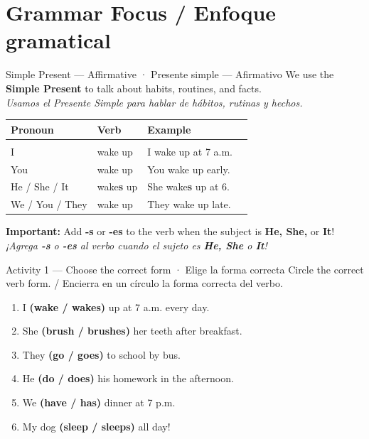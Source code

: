 
\section{Grammar Focus / Enfoque gramatical}

\begin{grammartip}{Simple Present — Affirmative · Presente simple — Afirmativo}
We use the \textbf{Simple Present} to talk about habits, routines, and facts. \\
\textit{Usamos el Presente Simple para hablar de hábitos, rutinas y hechos.}

\bigskip
\begin{center}
\begin{tabular}{llll}
\bfseries\color{kidsOrange}Pronoun & \bfseries\color{kidsOrange}Verb & \bfseries Example \\[4pt]
\hline\\[-6pt]
I              & wake up  & I wake up at 7 a.m.         \\
You            & wake up  & You wake up early.          \\
He / She / It  & wake\textbf{s} up & She wake\textbf{s} up at 6. \\
We / You / They & wake up & They wake up late.          \\
\end{tabular}
\end{center}

\bigskip
{\color{kidsRed}} \textbf{Important:} Add \textbf{-s} or \textbf{-es} to the verb when the subject is \textbf{He, She,} or \textbf{It}! \\
\textit{¡Agrega \textbf{-s} o \textbf{-es} al verbo cuando el sujeto es \textbf{He, She} o \textbf{It}!}
\end{grammartip}

\vspace{14pt}

\begin{activity}{Activity 1 — Choose the correct form · Elige la forma correcta}
Circle the correct verb form. / Encierra en un círculo la forma correcta del verbo.

\medskip
\begin{enumerate}
  \item I \textbf{(wake / wakes)} up at 7 a.m. every day.
  \item She \textbf{(brush / brushes)} her teeth after breakfast.
  \item They \textbf{(go / goes)} to school by bus.
  \item He \textbf{(do / does)} his homework in the afternoon.
  \item We \textbf{(have / has)} dinner at 7 p.m.
  \item My dog \textbf{(sleep / sleeps)} all day!
\end{enumerate}
\end{activity}

